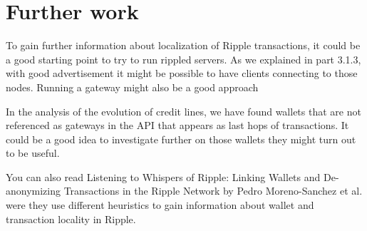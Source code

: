 \section{Further work}
To gain further information about localization of Ripple transactions, it could be a good starting point to try to run rippled servers. As we explained in part 3.1.3, with good advertisement it might be possible to have clients connecting to those nodes. Running a gateway might also be a good approach

In the analysis of the evolution of credit lines, we have found wallets that are not referenced as gateways in the API that appears as last hops of transactions. It could be a good idea to investigate further on those wallets they might turn out to be useful.

You can also read Listening to Whispers of Ripple: Linking Wallets and De-anonymizing Transactions in the Ripple Network by Pedro Moreno-Sanchez et al.\cite{ListeningtoWhispersofRipple} were they use different heuristics to gain information about wallet and transaction locality in Ripple.